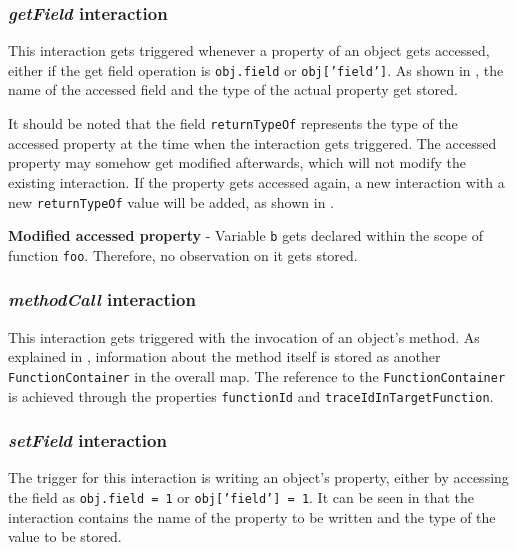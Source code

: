 \subsubsection{\textit{getField} interaction}
This interaction gets triggered whenever a property of an object gets accessed, either if the get field operation is \texttt{obj.field} or \texttt{obj['field']}. As shown in , the name of the accessed field and the type of the actual property get stored.

It should be noted that the field \texttt{returnTypeOf} represents the type of the accessed property at the time when the interaction gets triggered. The accessed property may somehow get modified afterwards, which will not modify the existing interaction. If the property gets accessed again, a new interaction with a new \texttt{returnTypeOf} value will be added, as shown in .

\begin{code}
  \caption[Modified accessed property]{\textbf{Modified accessed property} - Variable \texttt{b} gets declared within the scope of function \texttt{foo}. Therefore, no observation on it gets stored.}
  \label{code:get-field-changing-at-runtime}
\end{code}



\subsubsection{\textit{methodCall} interaction}
This interaction gets triggered with the invocation of an object's method. As explained in , information about the method itself is stored as another \texttt{FunctionContainer} in the overall map. The reference to the \texttt{FunctionContainer} is achieved through the properties \texttt{functionId} and \texttt{traceIdInTargetFunction}.



\subsubsection{\textit{setField} interaction}
The trigger for this interaction is writing an object's property, either by accessing the field as \texttt{obj.field = 1} or \texttt{obj['field'] = 1}. It can be seen in  that the interaction contains the name of the property to be written and the type of the value to be stored.

